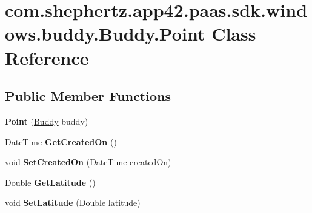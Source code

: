 \hypertarget{classcom_1_1shephertz_1_1app42_1_1paas_1_1sdk_1_1windows_1_1buddy_1_1_buddy_1_1_point}{\section{com.\+shephertz.\+app42.\+paas.\+sdk.\+windows.\+buddy.\+Buddy.\+Point Class Reference}
\label{classcom_1_1shephertz_1_1app42_1_1paas_1_1sdk_1_1windows_1_1buddy_1_1_buddy_1_1_point}
}
\subsection*{Public Member Functions}
\begin{DoxyCompactItemize}
\item 
\hypertarget{classcom_1_1shephertz_1_1app42_1_1paas_1_1sdk_1_1windows_1_1buddy_1_1_buddy_1_1_point_a84e0b3f01902f606dd513c00739f933c}{{\bfseries Point} (\hyperlink{classcom_1_1shephertz_1_1app42_1_1paas_1_1sdk_1_1windows_1_1buddy_1_1_buddy}{Buddy} buddy)}\label{classcom_1_1shephertz_1_1app42_1_1paas_1_1sdk_1_1windows_1_1buddy_1_1_buddy_1_1_point_a84e0b3f01902f606dd513c00739f933c}

\item 
\hypertarget{classcom_1_1shephertz_1_1app42_1_1paas_1_1sdk_1_1windows_1_1buddy_1_1_buddy_1_1_point_abd36391b0fcd8cf892e1a4a5ed7891d6}{Date\+Time {\bfseries Get\+Created\+On} ()}\label{classcom_1_1shephertz_1_1app42_1_1paas_1_1sdk_1_1windows_1_1buddy_1_1_buddy_1_1_point_abd36391b0fcd8cf892e1a4a5ed7891d6}

\item 
\hypertarget{classcom_1_1shephertz_1_1app42_1_1paas_1_1sdk_1_1windows_1_1buddy_1_1_buddy_1_1_point_aa1098f719e458a9a108314a659b1a71d}{void {\bfseries Set\+Created\+On} (Date\+Time created\+On)}\label{classcom_1_1shephertz_1_1app42_1_1paas_1_1sdk_1_1windows_1_1buddy_1_1_buddy_1_1_point_aa1098f719e458a9a108314a659b1a71d}

\item 
\hypertarget{classcom_1_1shephertz_1_1app42_1_1paas_1_1sdk_1_1windows_1_1buddy_1_1_buddy_1_1_point_af1849582a0e688eaff3ebd698d07cdd4}{Double {\bfseries Get\+Latitude} ()}\label{classcom_1_1shephertz_1_1app42_1_1paas_1_1sdk_1_1windows_1_1buddy_1_1_buddy_1_1_point_af1849582a0e688eaff3ebd698d07cdd4}

\item 
\hypertarget{classcom_1_1shephertz_1_1app42_1_1paas_1_1sdk_1_1windows_1_1buddy_1_1_buddy_1_1_point_ac6a69ac1fca4e3fe8c52495ff9afefcd}{void {\bfseries Set\+Latitude} (Double latitude)}\label{classcom_1_1shephertz_1_1app42_1_1paas_1_1sdk_1_1windows_1_1buddy_1_1_buddy_1_1_point_ac6a69ac1fca4e3fe8c52495ff9afefcd}


\end{DoxyCompactItemize}
